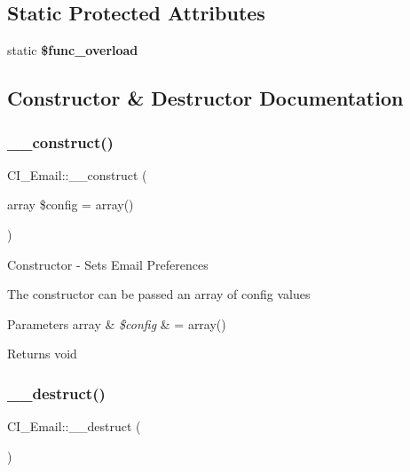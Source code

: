\subsection*{Static Protected Attributes}
\begin{DoxyCompactItemize}
\item 
\mbox{\label{class_c_i___email_a6e886bbe2fbfd8994babda01e9a9a5fe}} 
static {\bfseries \$func\+\_\+overload}
\end{DoxyCompactItemize}


\subsection{Constructor \& Destructor Documentation}
\mbox{\label{class_c_i___email_a27541ea39dbd180e9ad69e605a2028b0}} 
\subsubsection{\texorpdfstring{\+\_\+\+\_\+construct()}{\_\_construct()}}
{\footnotesize\ttfamily C\+I\+\_\+\+Email\+::\+\_\+\+\_\+construct (\begin{DoxyParamCaption}\item[{array}]{\$config = {\ttfamily array()} }\end{DoxyParamCaption})}

Constructor -\/ Sets Email Preferences

The constructor can be passed an array of config values


\begin{DoxyParams}[1]{Parameters}
array & {\em \$config} & = array() \\
\hline
\end{DoxyParams}
\begin{DoxyReturn}{Returns}
void 
\end{DoxyReturn}
\mbox{\label{class_c_i___email_a64e5a805b2fd3dee6313111e63696ab8}} 
\subsubsection{\texorpdfstring{\+\_\+\+\_\+destruct()}{\_\_destruct()}}
{\footnotesize\ttfamily C\+I\+\_\+\+Email\+::\+\_\+\+\_\+destruct (\begin{DoxyParamCaption}{ }\end{DoxyParamCaption})}

